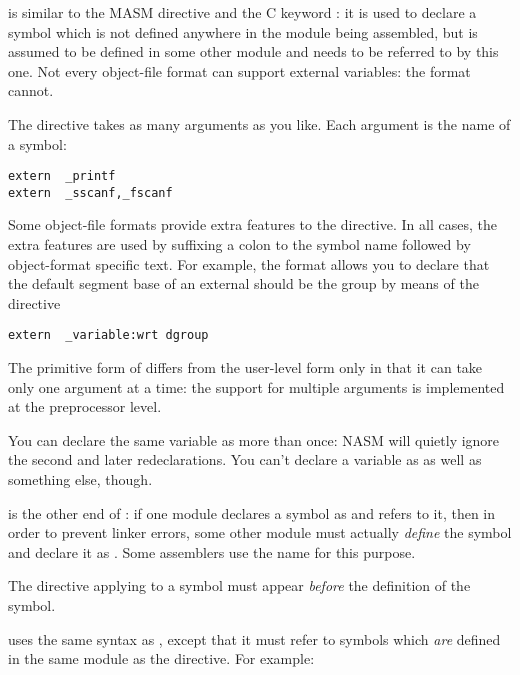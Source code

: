 
 is similar to the MASM directive  and
the C keyword : it is used to declare a symbol which
is not defined anywhere in the module being assembled, but is assumed
to be defined in some other module and needs to be referred to by this
one. Not every object-file format can support external variables:
the  format cannot.

The  directive takes as many arguments as you like.
Each argument is the name of a symbol:

\begin{lstlisting}
extern  _printf
extern  _sscanf,_fscanf
\end{lstlisting}

Some object-file formats provide extra features to the 
directive. In all cases, the extra features are used by suffixing a
colon to the symbol name followed by object-format specific text.
For example, the  format allows you to declare that the
default segment base of an external should be the group 
by means of the directive

\begin{lstlisting}
extern  _variable:wrt dgroup
\end{lstlisting}

The primitive form of  differs from the user-level form
only in that it can take only one argument at a time: the support
for multiple arguments is implemented at the preprocessor level.

You can declare the same variable as  more than once:
NASM will quietly ignore the second and later redeclarations.
You can't declare a variable as  as well as something
else, though.


 is the other end of : if one module declares a
symbol as  and refers to it, then in order to prevent
linker errors, some other module must actually \emph{define} the
symbol and declare it as . Some assemblers use the name
 for this purpose.

The  directive applying to a symbol must appear \emph{before}
the definition of the symbol.

 uses the same syntax as , except that it must
refer to symbols which \emph{are} defined in the same module as the
 directive. For example:

